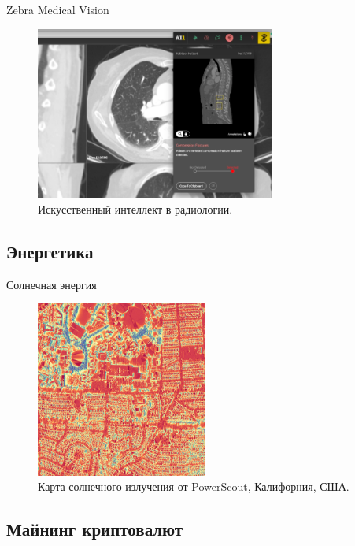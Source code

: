 \documentclass{beamer}
\begin{document}
\begin{frame}{Zebra Medical Vision}

\begin{figure}
\center
\includegraphics[width=0.7\textwidth]{Images/zebra.png}
\caption{\label{fig:zebra}Искусственный интеллект в радиологии.}
\end{figure}

\end{frame}

\subsection{Энергетика}

\begin{frame}{Солнечная энергия}

\begin{figure}
\center
\includegraphics[width=0.5\textwidth]{Images/solar_radiation.jpg}
\caption{\label{fig:solar}Карта солнечного излучения от PowerScout, Калифорния, США.}
\end{figure}

\end{frame}

\subsection{Майнинг криптовалют}
\end{document}
